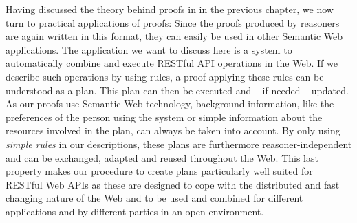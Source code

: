 % 
% 
Having discussed the theory behind proofs in \nthreelogic in the previous chapter, we now turn to practical applications of proofs: Since the proofs produced by \nthree reasoners are again written 
in this format, they can easily be used in other Semantic Web applications. The application we want to discuss here is a system to automatically combine and execute RESTful API operations
in the Web. If we describe such operations by using \nthree rules, a proof applying these rules can be understood as a plan. This plan can then be executed and -- if needed -- updated.
As our proofs use Semantic Web technology, background information, like the preferences of the person using the system or simple information about the resources involved in the plan,
can always be taken into account. By only using \emph{simple rules} in our descriptions, these plans are furthermore reasoner-independent and can be exchanged, adapted and reused 
throughout the Web. This last property makes our procedure to create plans particularly well suited for RESTful Web APIs %
as these are designed to cope with the distributed and fast changing nature of the Web and to be used and combined for different applications and by different parties 
in an open environment.

